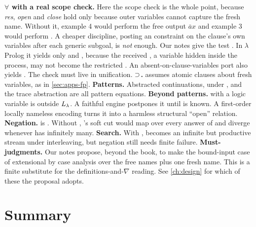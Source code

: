 {{\begin{kanren}
\textbf{$\forall$ with a real scope check.} Here the scope check is the whole point, because \emph{res},
\emph{open} and \emph{close} hold only because outer variables cannot capture the fresh name. Without it,
example 4 would perform the free output $\bar a x$ and example 3 would perform . A cheaper
discipline, posting an  constraint on the clause's own variables after each generic subgoal,
is \emph{not} enough. Our notes give the test . In
$\lambda$Prolog it yields only  and , because the received , a
variable hidden inside the process, may not become the restricted . An absent-on-clause-variables
port also yields . The check must live in unification.
\textbf{$\supset$.}  assumes atomic clauses about fresh variables, as in \cref{sec:apps-fp}.
\textbf{Patterns.} Abstracted continuations,  under , and the trace abstraction
 are all pattern equations. \textbf{Beyond patterns.}  with  a logic variable is
outside $L_\lambda$. A faithful engine postpones it until  is known. A first-order locally nameless
encoding turns it into a harmless structural ``open'' relation. \textbf{Negation.}  is
. Without , \micro{}'s soft cut would map  over every
answer of  and diverge whenever  has infinitely many. \textbf{Search.} With ,
 becomes an infinite but productive stream under interleaving, but negation still needs finite
failure. \textbf{Must-judgments.} Our notes propose, beyond the book, to make the bound-input case of
 extensional by case analysis over the free names plus one fresh name. This is a finite substitute
for the definitions-and-$\nabla$ reading. See \cref{ch:design} for which of these the proposal adopts.
\end{kanren}

\section{Summary}\label{sec:apps-summary}

}}
